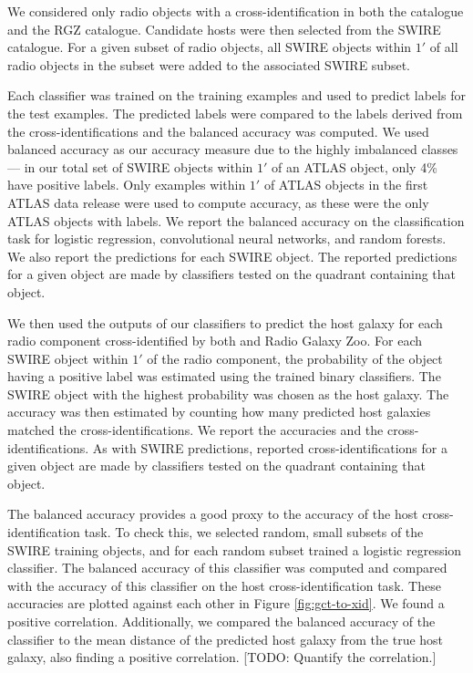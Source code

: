 \documentclass[fleqn,usenatbib,usedcolumn]{mnras}
\begin{document}
    We considered only radio objects with a cross-identification in both the
    \citet{norris06} catalogue and the RGZ catalogue. Candidate hosts
    were then selected from the SWIRE catalogue. For a given subset of radio
    objects, all SWIRE objects within $1'$ of all radio objects in the
    subset were added to the associated SWIRE subset.

    Each classifier was trained on the training examples and used to predict
    labels for the test examples. The predicted labels were compared to the
    labels derived from the \citet{norris06} cross-identifications and the
    balanced accuracy was computed. We used balanced accuracy as our accuracy
    measure due to the highly imbalanced classes --- in our total set of SWIRE
    objects within $1'$ of an ATLAS object, only 4\% have positive labels.
    Only examples within $1'$ of ATLAS objects in the first ATLAS data release
    \citep{norris06} were used to compute accuracy, as these were the only
    ATLAS objects with \citet{norris06} labels. We report the balanced
    accuracy on the classification task for logistic regression, convolutional
    neural networks, and random forests. We also report the predictions for
    each SWIRE object. The reported predictions for a given object are made by
    classifiers tested on the quadrant containing that object.

    We then used the outputs of our classifiers to predict the host galaxy
    for each radio component cross-identified by both \citet{norris06}
    and Radio Galaxy Zoo. For each SWIRE object within $1'$ of the radio
    component, the probability of the object having a positive label was
    estimated using the trained binary classifiers. The SWIRE object with
    the highest probability was chosen as the host galaxy. The accuracy was
    then estimated by counting how many predicted host galaxies matched the
    \citet{norris06} cross-identifications. We report the accuracies and the
    cross-identifications. As with SWIRE predictions, reported
    cross-identifications for a given object are made by classifiers tested
    on the quadrant containing that object.

    The balanced accuracy provides a good proxy to the accuracy of the host
    cross-identification task. To check this, we selected random, small
    subsets of the SWIRE training objects, and for each random subset trained
    a logistic regression classifier. The balanced accuracy of this classifier
    was computed and compared with the accuracy of this classifier on the host
    cross-identification task. These accuracies are plotted against each other
    in Figure \ref{fig:gct-to-xid}. We found a positive correlation.
    Additionally, we compared the balanced accuracy of the classifier to the
    mean distance of the predicted host galaxy from the true host galaxy, also
    finding a positive correlation. [TODO: Quantify the correlation.]
\end{document}
